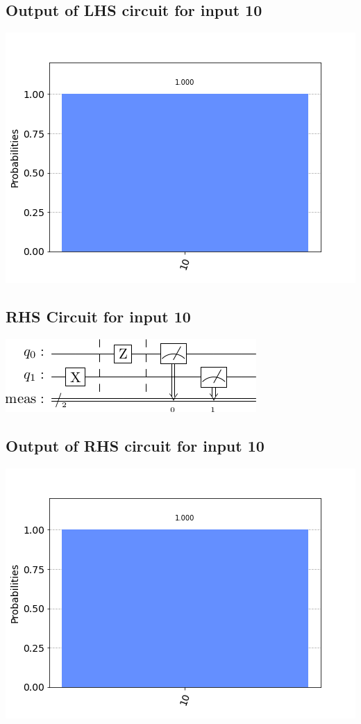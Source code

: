 \documentclass[a4paper]{article}
\begin{document}
\begin{answer}[Question 1 b (b)]
        \subsection*{Output of LHS circuit for input 10}
        \includegraphics[scale = 0.5]{b110-out.png}
        \subsection*{RHS Circuit for input 10}
        \includegraphics[scale=0.5]{b210.png}
        \subsection*{Output of RHS circuit for input 10}
        \includegraphics[scale = 0.5]{b210-out.png}

\end{answer}
\end{document}
